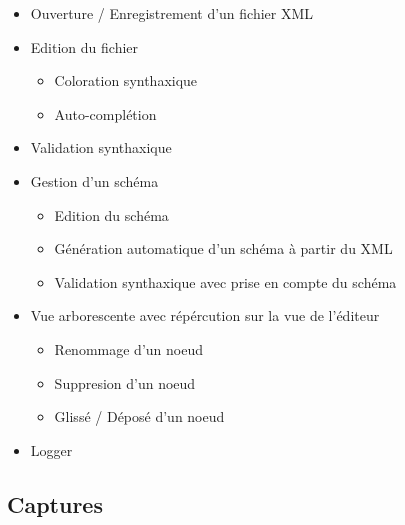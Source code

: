 \begin{itemize}
\item Ouverture / Enregistrement d'un fichier XML
\item Edition du fichier
  \begin{itemize}
  \item Coloration synthaxique
  \item Auto-complétion
  \end{itemize}
\item Validation synthaxique
\item Gestion d'un schéma
  \begin{itemize}
  \item Edition du schéma
  \item Génération automatique d'un schéma à partir du XML
  \item Validation synthaxique avec prise en compte du schéma
  \end{itemize}
\item Vue arborescente avec répércution sur la vue de l'éditeur
  \begin{itemize}
  \item Renommage d'un noeud
  \item Suppresion d'un noeud
  \item Glissé / Déposé d'un noeud
  \end{itemize}
\item Logger
\end{itemize}

\subsection{Captures}


